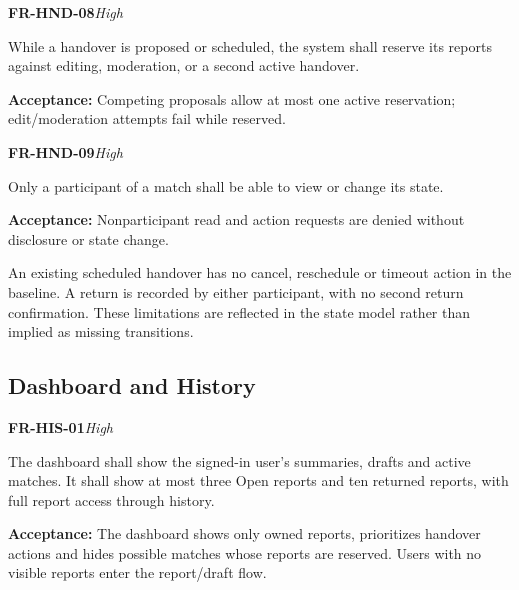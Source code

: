 \documentclass[12pt,a4paper,oneside]{report}
\begin{document}
\noindent\begin{minipage}{\linewidth}\textbf{FR-HND-08}\hfill\textit{High}\par\nopagebreak

While a handover is proposed or scheduled, the system shall reserve its reports against editing, moderation, or a second active handover.

{\color{muted}\textbf{Acceptance:} Competing proposals allow at most one active reservation; edit/moderation attempts fail while reserved.\par}\end{minipage}\par\vspace{5pt}

\noindent\begin{minipage}{\linewidth}\textbf{FR-HND-09}\hfill\textit{High}\par\nopagebreak

Only a participant of a match shall be able to view or change its state.

{\color{muted}\textbf{Acceptance:} Nonparticipant read and action requests are denied without disclosure or state change.\par}\end{minipage}\par\vspace{5pt}

An existing scheduled handover has no cancel, reschedule or timeout action in the baseline. A return is recorded by either participant, with no second return confirmation. These limitations are reflected in the state model rather than implied as missing transitions.


\subsection{Dashboard and History}

\noindent\begin{minipage}{\linewidth}\textbf{FR-HIS-01}\hfill\textit{High}\par\nopagebreak

The dashboard shall show the signed-in user's summaries, drafts and active matches. It shall show at most three Open reports and ten returned reports, with full report access through history.

{\color{muted}\textbf{Acceptance:} The dashboard shows only owned reports, prioritizes handover actions and hides possible matches whose reports are reserved. Users with no visible reports enter the report/draft flow.\par}\end{minipage}\par\vspace{5pt}
\end{document}
